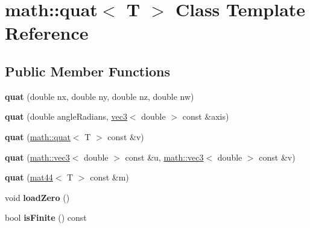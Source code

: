 \hypertarget{classmath_1_1quat}{
\section{math::quat$<$ T $>$ Class Template Reference}
\label{classmath_1_1quat}
}
\subsection*{Public Member Functions}
\begin{DoxyCompactItemize}
\item 
\hypertarget{classmath_1_1quat_a3040f78fd23f37058062127dfee7d86b}{
{\bfseries quat} (double nx, double ny, double nz, double nw)}
\label{classmath_1_1quat_a3040f78fd23f37058062127dfee7d86b}

\item 
\hypertarget{classmath_1_1quat_ab60827cbd63dbc074028aa8efb4c1d35}{
{\bfseries quat} (double angleRadians, \hyperlink{classmath_1_1vec3}{vec3}$<$ double $>$ const \&axis)}
\label{classmath_1_1quat_ab60827cbd63dbc074028aa8efb4c1d35}

\item 
\hypertarget{classmath_1_1quat_a89e584ce343bd15a132f91568034ace9}{
{\bfseries quat} (\hyperlink{classmath_1_1quat}{math::quat}$<$ T $>$ const \&v)}
\label{classmath_1_1quat_a89e584ce343bd15a132f91568034ace9}

\item 
\hypertarget{classmath_1_1quat_a583ca69f15e7c569370d9ecffd157f08}{
{\bfseries quat} (\hyperlink{classmath_1_1vec3}{math::vec3}$<$ double $>$ const \&u, \hyperlink{classmath_1_1vec3}{math::vec3}$<$ double $>$ const \&v)}
\label{classmath_1_1quat_a583ca69f15e7c569370d9ecffd157f08}

\item 
\hypertarget{classmath_1_1quat_aa0bfec26e0c12bebd828a6a0b22e8607}{
{\bfseries quat} (\hyperlink{classmath_1_1mat44}{mat44}$<$ T $>$ const \&m)}
\label{classmath_1_1quat_aa0bfec26e0c12bebd828a6a0b22e8607}

\item 
\hypertarget{classmath_1_1quat_a717257da12352869f790b9917c2b702b}{
void {\bfseries loadZero} ()}
\label{classmath_1_1quat_a717257da12352869f790b9917c2b702b}

\item 
\hypertarget{classmath_1_1quat_affa82799e59b2c74a7c9f1dd460ed6f9}{
bool {\bfseries isFinite} () const }
\label{classmath_1_1quat_affa82799e59b2c74a7c9f1dd460ed6f9}


\end{DoxyCompactItemize}
